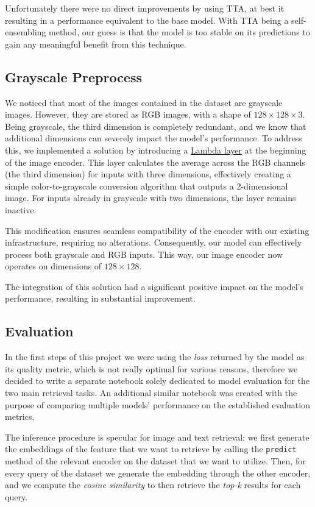 \documentclass[10pt,twocolumn,letterpaper]{article}
\begin{document}
Unfortunately there were no direct improvements by using TTA, at best it resulting in a performance equivalent to the base model.
With TTA being a self-ensembling method, our guess is that the model is too stable on its predictions to gain any meaningful benefit from this technique.

\subsection{Grayscale Preprocess}
We noticed that most of the images contained in the dataset are grayscale images. However, they are stored as RGB images, with a shape of $ 128 \times 128 \times 3 $. Being grayscale, the third dimension is completely redundant, and we know that additional dimensions can severely impact the model's performance. To address this, we implemented a solution by introducing a \href{https://www.tensorflow.org/api_docs/python/tf/keras/layers/Lambda}{Lambda layer} at the beginning of the image encoder. This layer calculates the average across the RGB channels (the third dimension) for inputs with three dimensions, effectively creating a simple color-to-grayscale conversion algorithm that outputs a 2-dimensional image. For inputs already in grayscale with two dimensions, the layer remains inactive.

This modification ensures seamless compatibility of the encoder with our existing infrastructure, requiring no alterations. Consequently, our model can effectively process both grayscale and RGB inputs. This way, our image encoder now operates on dimensions of $128 \times 128$.

The integration of this solution had a significant positive impact on the model's performance, resulting in substantial improvement.

\subsection{Evaluation}
In the first steps of this project we were using the \textit{loss} returned by the model as its quality metric, which is not really optimal for various reasons, therefore we decided to write a separate notebook solely dedicated to model evaluation for the two main retrieval tasks.
An additional similar notebook was created with the purpose of comparing multiple models' performance on the established evaluation metrics.

The inference procedure is specular for image and text retrieval: we first generate the embeddings of the feature that we want to retrieve by calling the \texttt{predict} method of the relevant encoder on the dataset that we want to utilize.
Then, for every query of the dataset we generate the embedding through the other encoder, and we compute the \textit{cosine similarity} to then retrieve the \textit{top-k} results for each query.
\end{document}
